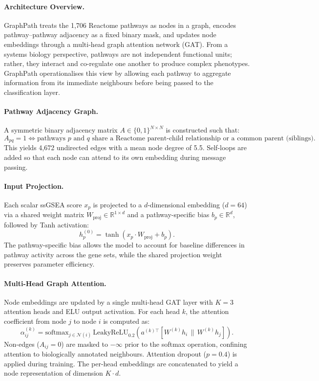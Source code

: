 \paragraph{Architecture Overview.}
GraphPath treats the 1,706 Reactome pathways as nodes in a graph, encodes pathway--pathway adjacency as a fixed binary mask, and updates node embeddings through a multi-head graph attention network (GAT). From a systems biology perspective, pathways are not independent functional units; rather, they interact and co-regulate one another to produce complex phenotypes. GraphPath operationalises this view by allowing each pathway to aggregate information from its immediate neighbours before being passed to the classification layer.

\paragraph{Pathway Adjacency Graph.}
A symmetric binary adjacency matrix $A \in \{0,1\}^{N \times N}$ is constructed such that:
\begin{equation}
A_{pq} = 1 \iff \text{pathways } p \text{ and } q \text{ share a Reactome parent-child relationship or a common parent (siblings).}
\end{equation}
This yields 4,672 undirected edges with a mean node degree of 5.5. Self-loops are added so that each node can attend to its own embedding during message passing.

\paragraph{Input Projection.}
Each scalar ssGSEA score $x_p$ is projected to a $d$-dimensional embedding ($d = 64$) via a shared weight matrix $W_{\text{proj}} \in \mathbb{R}^{1 \times d}$ and a pathway-specific bias $b_p \in \mathbb{R}^d$, followed by Tanh activation:
\begin{equation}
h^{(0)}_p = \tanh\!\left(x_p \cdot W_{\text{proj}} + b_p\right).
\end{equation}
The pathway-specific bias allows the model to account for baseline differences in pathway activity across the gene sets, while the shared projection weight preserves parameter efficiency.

\paragraph{Multi-Head Graph Attention.}
Node embeddings are updated by a single multi-head GAT layer with $K = 3$ attention heads and ELU output activation. For each head $k$, the attention coefficient from node $j$ to node $i$ is computed as:
\begin{equation}
\alpha^{(k)}_{ij} = \text{softmax}_{j \in \mathcal{N}(i)}\,\text{LeakyReLU}_{0.2}\!\left(a^{(k)\top}\!\left[W^{(k)}h_i \,\|\, W^{(k)}h_j\right]\right).
\end{equation}
Non-edges ($A_{ij} = 0$) are masked to $-\infty$ prior to the softmax operation, confining attention to biologically annotated neighbours. Attention dropout ($p = 0.4$) is applied during training. The per-head embeddings are concatenated to yield a node representation of dimension $K \cdot d$.

